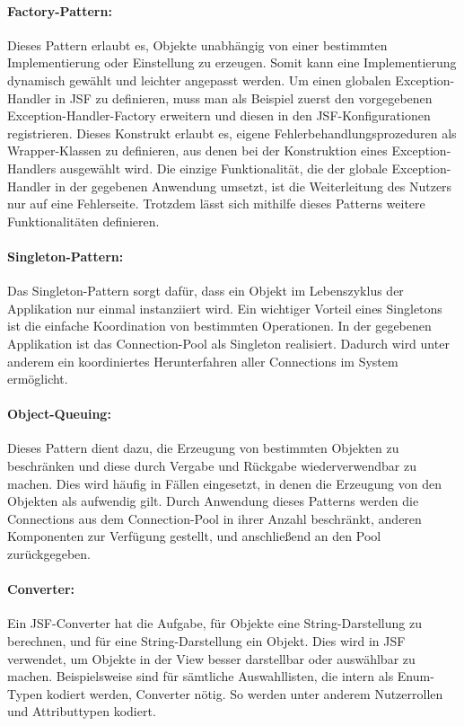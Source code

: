 \documentclass{article}
\begin{document}
\paragraph{Factory-Pattern:}
Dieses Pattern erlaubt es, Objekte unabhängig von einer bestimmten Implementierung oder Einstellung zu erzeugen. Somit kann eine Implementierung dynamisch gewählt und leichter angepasst werden.
Um einen globalen Exception-Handler in JSF zu definieren, muss man als Beispiel zuerst den vorgegebenen Exception-Handler-Factory erweitern und diesen in den JSF-Konfigurationen registrieren.
Dieses Konstrukt erlaubt es, eigene Fehlerbehandlungsprozeduren als Wrapper-Klassen zu definieren, aus denen bei der Konstruktion eines Exception-Handlers ausgewählt wird.
Die einzige Funktionalität, die der globale Exception-Handler in der gegebenen Anwendung umsetzt, ist die Weiterleitung des Nutzers nur auf eine Fehlerseite. Trotzdem lässt sich mithilfe dieses Patterns weitere Funktionalitäten definieren.

\paragraph{Singleton-Pattern:}
Das Singleton-Pattern sorgt dafür, dass ein Objekt im Lebenszyklus der Applikation nur einmal instanziiert wird. Ein wichtiger Vorteil eines Singletons ist die einfache Koordination von bestimmten Operationen.
In der gegebenen Applikation ist das Connection-Pool als Singleton realisiert. Dadurch wird unter anderem ein koordiniertes Herunterfahren aller Connections im System ermöglicht.

\paragraph{Object-Queuing:}
Dieses Pattern dient dazu, die Erzeugung von bestimmten Objekten zu beschränken und diese durch Vergabe und Rückgabe wiederverwendbar zu machen. Dies wird häufig in Fällen eingesetzt, in denen die Erzeugung von den Objekten als aufwendig gilt.
Durch Anwendung dieses Patterns werden die Connections aus dem Connection-Pool in ihrer Anzahl beschränkt, anderen Komponenten zur Verfügung gestellt, und anschließend an den Pool zurückgegeben.

\paragraph{Converter:}
Ein JSF-Converter hat die Aufgabe, für Objekte eine String-Darstellung zu berechnen, und für eine String-Darstellung ein Objekt. Dies wird in JSF verwendet, um Objekte in der View besser darstellbar oder auswählbar zu machen.
Beispielsweise sind für sämtliche Auswahllisten, die intern als Enum-Typen kodiert werden, Converter nötig. So werden unter anderem Nutzerrollen und Attributtypen kodiert.
\end{document}
